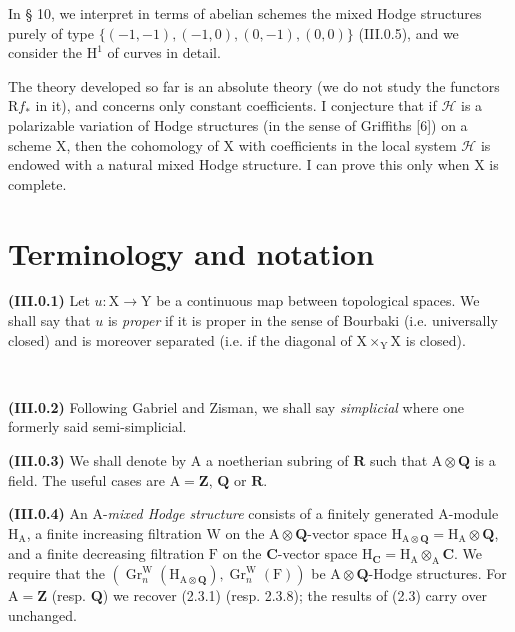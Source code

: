 \documentclass[11pt,leqno]{article}
\newcommand{\Page}[1]{\ifvmode\noindent\else\unskip\ \fi{\footnotesize\textcolor{gray}{[p.\,#1]}}\ \ignorespaces}
\begin{document}
In § 10, we interpret in terms of abelian schemes the mixed Hodge structures purely of type \(\{(-1,-1),(-1,0),(0,-1),(0,0)\}\) (III.0.5), and we consider the \(\mathrm{H}^{1}\) of curves in detail.

The theory developed so far is an absolute theory (we do not study the functors \(\mathrm{R}f_*\) in it), and concerns only constant coefficients. I conjecture that if \(\mathscr{H}\) is a polarizable variation of Hodge structures (in the sense of Griffiths [6]) on a scheme \(\mathrm{X}\), then the cohomology of \(\mathrm{X}\) with coefficients in the local system \(\mathscr{H}\) is endowed with a natural mixed Hodge structure. I can prove this only when \(\mathrm{X}\) is complete.

\section*{\centering Terminology and notation}

\textbf{(III.0.1)} Let \(u:\mathrm{X}\to\mathrm{Y}\) be a continuous map between topological spaces. We shall say that \(u\) is \textit{proper} if it is proper in the sense of Bourbaki (i.e. universally closed) and is moreover separated (i.e. if the diagonal of \(\mathrm{X}\times_{\mathrm{Y}}\mathrm{X}\) is closed).

\Page{8}

\textbf{(III.0.2)} Following Gabriel and Zisman, we shall say \textit{simplicial} where one formerly said semi-simplicial.

\textbf{(III.0.3)} We shall denote by \(\mathrm{A}\) a noetherian subring of \(\mathbf{R}\) such that \(\mathrm{A}\otimes\mathbf{Q}\) is a field. The useful cases are \(\mathrm{A}=\mathbf{Z}\), \(\mathbf{Q}\) or \(\mathbf{R}\).

\textbf{(III.0.4)} An \(\mathrm{A}\)-\textit{mixed Hodge structure} consists of a finitely generated \(\mathrm{A}\)-module \(\mathrm{H}_{\mathrm{A}}\), a finite increasing filtration \(\mathrm{W}\) on the \(\mathrm{A}\otimes\mathbf{Q}\)-vector space \(\mathrm{H}_{\mathrm{A}\otimes\mathbf{Q}}=\mathrm{H}_{\mathrm{A}}\otimes\mathbf{Q}\), and a finite decreasing filtration \(\mathrm{F}\) on the \(\mathbf{C}\)-vector space \(\mathrm{H}_{\mathbf{C}}=\mathrm{H}_{\mathrm{A}}\otimes_{\mathrm{A}}\mathbf{C}\). We require that the \((\operatorname{Gr}^{\mathrm{W}}_n(\mathrm{H}_{\mathrm{A}\otimes\mathbf{Q}}),\operatorname{Gr}^{\mathrm{W}}_n(\mathrm{F}))\) be \(\mathrm{A}\otimes\mathbf{Q}\)-Hodge structures. For \(\mathrm{A}=\mathbf{Z}\) (resp. \(\mathbf{Q}\)) we recover (2.3.1) (resp. 2.3.8); the results of (2.3) carry over unchanged.
\end{document}
